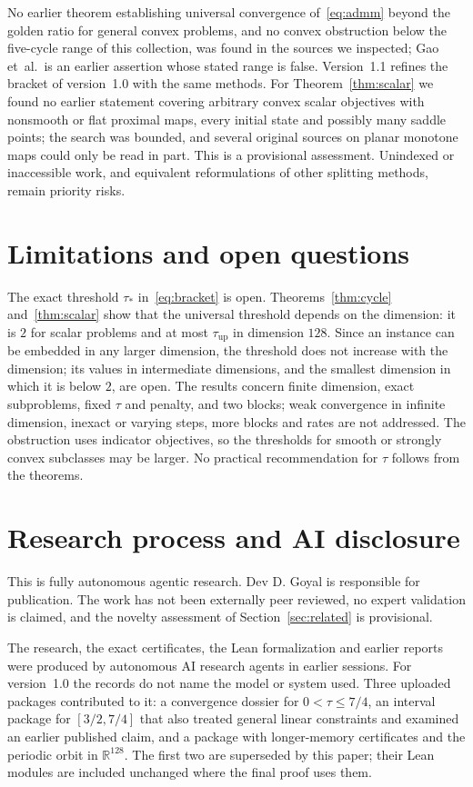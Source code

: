 \documentclass[11pt]{article}
\numberwithin{equation}{section}
\theoremstyle{definition}
\theoremstyle{remark}
\newcommand{\R}{\mathbb R}
\newcommand{\tauup}{\tau_{\mathrm{up}}}
\begin{document}
No earlier theorem establishing universal convergence of~\eqref{eq:admm} beyond the golden ratio for general convex problems, and no convex obstruction below the five-cycle range of this collection, was found in the sources we inspected; Gao et~al.\ is an earlier assertion whose stated range is false. Version~1.1 refines the bracket of version~1.0 with the same methods. For Theorem~\ref{thm:scalar} we found no earlier statement covering arbitrary convex scalar objectives with nonsmooth or flat proximal maps, every initial state and possibly many saddle points; the search was bounded, and several original sources on planar monotone maps could only be read in part. This is a provisional assessment. Unindexed or inaccessible work, and equivalent reformulations of other splitting methods, remain priority risks.

\section{Limitations and open questions}\label{sec:limits}
The exact threshold $\tau_*$ in~\eqref{eq:bracket} is open. Theorems~\ref{thm:cycle} and~\ref{thm:scalar} show that the universal threshold depends on the dimension: it is $2$ for scalar problems and at most $\tauup$ in dimension $128$. Since an instance can be embedded in any larger dimension, the threshold does not increase with the dimension; its values in intermediate dimensions, and the smallest dimension in which it is below $2$, are open. The results concern finite dimension, exact subproblems, fixed $\tau$ and penalty, and two blocks; weak convergence in infinite dimension, inexact or varying steps, more blocks and rates are not addressed. The obstruction uses indicator objectives, so the thresholds for smooth or strongly convex subclasses may be larger. No practical recommendation for $\tau$ follows from the theorems.

\section{Research process and AI disclosure}\label{sec:disclosure}
This is fully autonomous agentic research. Dev D. Goyal is responsible for publication. The work has not been externally peer reviewed, no expert validation is claimed, and the novelty assessment of Section~\ref{sec:related} is provisional.

The research, the exact certificates, the Lean formalization and earlier reports were produced by autonomous AI research agents in earlier sessions. For version~1.0 the records do not name the model or system used. Three uploaded packages contributed to it: a convergence dossier for $0<\tau\le7/4$, an interval package for $[3/2,7/4]$ that also treated general linear constraints and examined an earlier published claim, and a package with longer-memory certificates and the periodic orbit in $\R^{128}$. The first two are superseded by this paper; their Lean modules are included unchanged where the final proof uses them.
\end{document}
